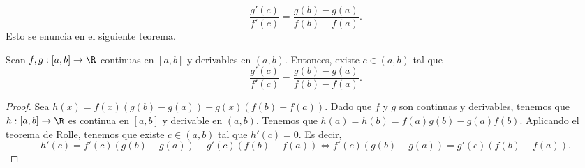\[ \frac{g'\left(c\right)}{f'\left(c\right)} = \frac{g\left(b\right)-g\left(a\right)}{f\left(b\right)-f\left(a\right)} .\]
Esto se enuncia en el siguiente teorema.
\begin{ftheorem}
	\normalfont Sean $\displaystyle f,g : \left[a,b\right] \to \R $ continuas en $\displaystyle \left[a,b\right]  $ y derivables en $\displaystyle \left(a,b\right) $. Entonces, existe $\displaystyle c \in \left(a,b\right) $ tal que 
	\[\frac{g'\left(c\right)}{f'\left(c\right)} = \frac{g\left(b\right)-g\left(a\right)}{f\left(b\right)-f\left(a\right)} .\]
\end{ftheorem}
\begin{proof}
	Sea $\displaystyle h\left(x\right) = f\left(x\right)\left(g\left(b\right)-g\left(a\right)\right) - g\left(x\right)\left(f\left(b\right)-f\left(a\right)\right) $. Dado que $\displaystyle f $ y $\displaystyle g $ son continuas y derivables, tenemos que $\displaystyle h: [a,b] \to \R $ es continua en $\displaystyle [a,b] $ y derivable en $\displaystyle \left(a,b\right) $.
Tenemos que $\displaystyle h\left(a\right)=h\left(b\right) = f\left(a\right)g\left(b\right)-g\left(a\right)f\left(b\right) $. Aplicando el teorema de Rolle, tenemos que existe $\displaystyle c \in \left(a,b\right) $ tal que $\displaystyle h'\left(c\right) = 0 $. Es decir, 
\[ h'\left(c\right) = f'\left(c\right)\left(g\left(b\right)-g\left(a\right)\right) - g'\left(c\right)\left(f\left(b\right)-f\left(a\right)\right) \iff f'\left(c\right)\left(g\left(b\right)-g\left(a\right)\right) = g'\left(c\right)\left(f\left(b\right)-f\left(a\right)\right) .\]
\end{proof}

